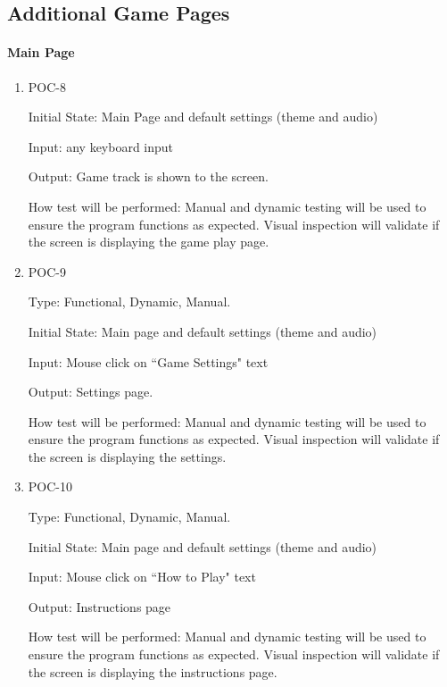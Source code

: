 \documentclass[12pt, titlepage]{article}
\begin{document}
	\subsection{Additional Game Pages}
	
	\paragraph{Main Page}
	
	\begin{enumerate}
		
		\item{POC-8\\}
		
		Initial State: Main Page and default settings (theme and audio)
		
		Input: any keyboard input 
		
		Output: Game track is shown to the screen. 
		
		How test will be performed: Manual and dynamic testing will be used to ensure the program functions as expected. Visual inspection will validate if the screen is displaying the game play page. 
		
		\item{POC-9\\}
		
		Type: Functional, Dynamic, Manual.
		
		Initial State: Main page and default settings (theme and audio) 
		
		Input: Mouse click on ``Game Settings" text
		
		Output: Settings page. 
		
		How test will be performed: Manual and dynamic testing will be used to ensure the program functions as expected. Visual inspection will validate if the screen is displaying the settings.  
		
		\item{POC-10\\}
		
		Type: Functional, Dynamic, Manual.
		
		Initial State: Main page and default settings (theme and audio) 
		
		Input: Mouse click on ``How to Play" text
		
		Output: Instructions page
		
		How test will be performed: Manual and dynamic testing will be used to ensure the program functions as expected. Visual inspection will validate if the screen is displaying the instructions page. 
		
	\end{enumerate}
	
\end{document}
